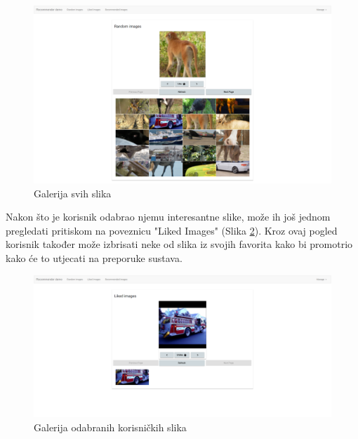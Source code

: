 \documentclass[times, utf8, proizvoljni, numeric]{fer}
\begin{document}
\begin{figure}[!ht]
	\begin{center}
		\captionsetup{justification=centering}
		\includegraphics[width=1.0\textwidth]{./imgs/demo-preporucitelja-po-sadrzaju/tijek-rada/demo-rand.png}
		\caption{Galerija svih slika}
		\label{fg:demo_rand}
	\end{center}
\end{figure}


Nakon što je korisnik odabrao njemu interesantne slike, može ih još jednom pregledati pritiskom na poveznicu "Liked Images" (Slika \ref{fg:demo_liked}). Kroz ovaj pogled korisnik također može izbrisati neke od slika iz svojih favorita kako bi promotrio kako će to utjecati na preporuke sustava.

\begin{figure}[H]
	\begin{center}
		\captionsetup{justification=centering}
		\includegraphics[width=1.0\textwidth]{./imgs/demo-preporucitelja-po-sadrzaju/tijek-rada/demo-liked.png}
		\caption{Galerija odabranih korisničkih slika}
		\label{fg:demo_liked}
	\end{center}
\end{figure}
\end{document}
